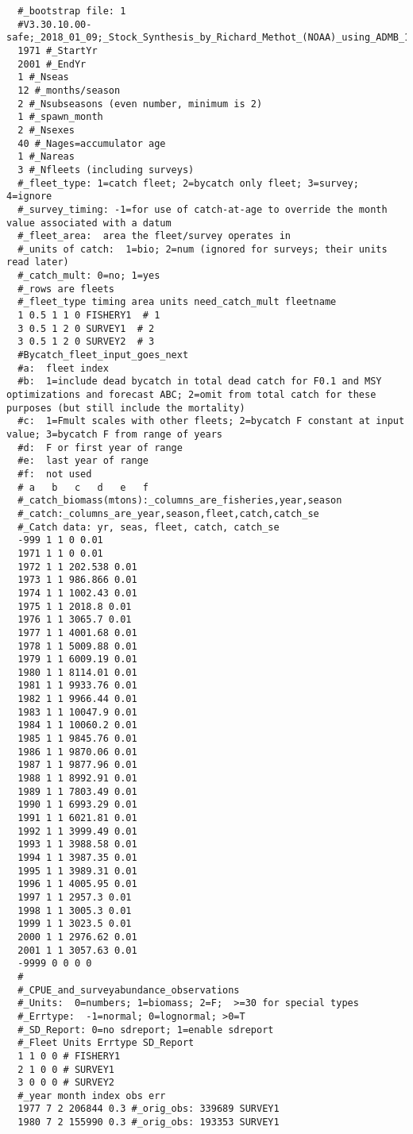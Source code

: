 \begin{landscape}
{\begin{verbatim}
  #_bootstrap file: 1
  #V3.30.10.00-safe;_2018_01_09;_Stock_Synthesis_by_Richard_Methot_(NOAA)_using_ADMB_11.6
  1971 #_StartYr
  2001 #_EndYr
  1 #_Nseas
  12 #_months/season
  2 #_Nsubseasons (even number, minimum is 2)
  1 #_spawn_month
  2 #_Nsexes
  40 #_Nages=accumulator age
  1 #_Nareas
  3 #_Nfleets (including surveys)
  #_fleet_type: 1=catch fleet; 2=bycatch only fleet; 3=survey; 4=ignore 
  #_survey_timing: -1=for use of catch-at-age to override the month value associated with a datum 
  #_fleet_area:  area the fleet/survey operates in 
  #_units of catch:  1=bio; 2=num (ignored for surveys; their units read later)
  #_catch_mult: 0=no; 1=yes
  #_rows are fleets
  #_fleet_type timing area units need_catch_mult fleetname
  1 0.5 1 1 0 FISHERY1  # 1
  3 0.5 1 2 0 SURVEY1  # 2
  3 0.5 1 2 0 SURVEY2  # 3
  #Bycatch_fleet_input_goes_next
  #a:  fleet index
  #b:  1=include dead bycatch in total dead catch for F0.1 and MSY optimizations and forecast ABC; 2=omit from total catch for these purposes (but still include the mortality)
  #c:  1=Fmult scales with other fleets; 2=bycatch F constant at input value; 3=bycatch F from range of years
  #d:  F or first year of range
  #e:  last year of range
  #f:  not used
  # a   b   c   d   e   f 
  #_catch_biomass(mtons):_columns_are_fisheries,year,season
  #_catch:_columns_are_year,season,fleet,catch,catch_se
  #_Catch data: yr, seas, fleet, catch, catch_se
  -999 1 1 0 0.01
  1971 1 1 0 0.01
  1972 1 1 202.538 0.01
  1973 1 1 986.866 0.01
  1974 1 1 1002.43 0.01
  1975 1 1 2018.8 0.01
  1976 1 1 3065.7 0.01
  1977 1 1 4001.68 0.01
  1978 1 1 5009.88 0.01
  1979 1 1 6009.19 0.01
  1980 1 1 8114.01 0.01
  1981 1 1 9933.76 0.01
  1982 1 1 9966.44 0.01
  1983 1 1 10047.9 0.01
  1984 1 1 10060.2 0.01
  1985 1 1 9845.76 0.01
  1986 1 1 9870.06 0.01
  1987 1 1 9877.96 0.01
  1988 1 1 8992.91 0.01
  1989 1 1 7803.49 0.01
  1990 1 1 6993.29 0.01
  1991 1 1 6021.81 0.01
  1992 1 1 3999.49 0.01
  1993 1 1 3988.58 0.01
  1994 1 1 3987.35 0.01
  1995 1 1 3989.31 0.01
  1996 1 1 4005.95 0.01
  1997 1 1 2957.3 0.01
  1998 1 1 3005.3 0.01
  1999 1 1 3023.5 0.01
  2000 1 1 2976.62 0.01
  2001 1 1 3057.63 0.01
  -9999 0 0 0 0
  #
  #_CPUE_and_surveyabundance_observations
  #_Units:  0=numbers; 1=biomass; 2=F;  >=30 for special types
  #_Errtype:  -1=normal; 0=lognormal; >0=T
  #_SD_Report: 0=no sdreport; 1=enable sdreport
  #_Fleet Units Errtype SD_Report
  1 1 0 0 # FISHERY1
  2 1 0 0 # SURVEY1
  3 0 0 0 # SURVEY2
  #_year month index obs err
  1977 7 2 206844 0.3 #_orig_obs: 339689 SURVEY1
  1980 7 2 155990 0.3 #_orig_obs: 193353 SURVEY1

\end{verbatim}}
\end{landscape}
